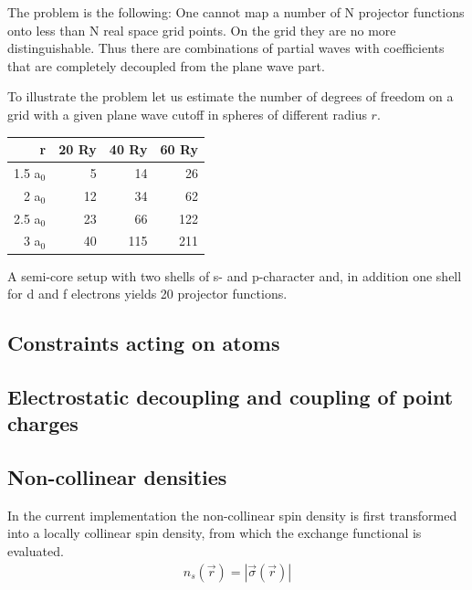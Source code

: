 \documentclass[final,12pt]{article}
\begin{document}
{{{{{{The problem is the following: One cannot map a number of N projector
functions onto less than N real space grid points. On the grid they
are no more distinguishable. Thus there are combinations of partial
waves with coefficients that are completely decoupled from the plane
wave part. 

To illustrate the problem let us estimate the number of degrees of
freedom on a grid with a given plane wave cutoff in spheres of
different radius $r$.

\begin{center}
\begin{tabular}{|r|r|r|r|}
\hline
r      & 20 Ry & 40 Ry & 60 Ry \\
\hline
1.5 a$_0$ &  5 &  14 &  26 \\
2   a$_0$& 12 &  34 &  62 \\
2.5 a$_0$& 23 &  66 &  122\\
3   a$_0$& 40 & 115 & 211 \\
\hline
\end{tabular}
\end{center}

A semi-core setup with two shells of s- and p-character and, in
addition one shell for d and f electrons yields 20 projector
functions.




\subsection{Constraints acting on atoms}


\subsection{Electrostatic decoupling and coupling of point charges}

\subsection{Non-collinear densities}
\label{sec:noncollinear}
In the current implementation the non-collinear spin density is first
transformed into a locally collinear spin density, from which the
exchange functional is evaluated. 
\begin{eqnarray*}
n_s(\vec{r})= |\vec{\sigma}(\vec{r})|
\end{eqnarray*}

}}}}}}
\end{document}
